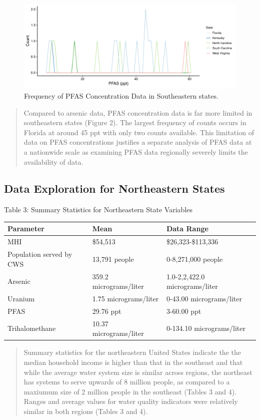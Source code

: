 \documentclass[12pt,]{article}
\begin{document}
\begin{figure}
\centering
\includegraphics{Project_Template_files/figure-latex/figs2-1.pdf}
\caption{Frequency of PFAS Concentration Data in Southeastern states.}
\end{figure}

\begin{quote}
Compared to arsenic data, PFAS concentration data is far more limited in
southeastern states (Figure 2). The largest frequency of counts occurs
in Florida at around 45 ppt with only two counts available. This
limitation of data on PFAS concentrations justifies a separate analysis
of PFAS data at a nationwide scale as examining PFAS data regionally
severely limits the availability of data.
\end{quote}

\newpage

\hypertarget{data-exploration-for-northeastern-states}{%
\subsection{Data Exploration for Northeastern
States}\label{data-exploration-for-northeastern-states}}

Table 3: Summary Statistics for Northeastern State Variables

\begin{longtable}[]{@{}lll@{}}
\toprule
\textbf{Parameter} & \textbf{Mean} & \textbf{Data Range}\tabularnewline
\midrule
\endhead
MHI & \$54,513 & \$26,323-\$113,336\tabularnewline
Population served by CWS & 13,791 people & 0-8,271,000
people\tabularnewline
Arsenic & 359.2 micrograms/liter & 1.0-2,2,422.0
micrograms/liter\tabularnewline
Uranium & 1.75 micrograms/liter & 0-43.00
micrograms/liter\tabularnewline
PFAS & 29.76 ppt & 3-60.00 ppt\tabularnewline
Trihalomethane & 10.37 micrograms/liter & 0-134.10
micrograms/liter\tabularnewline
\bottomrule
\end{longtable}

\begin{quote}
Summary statistics for the northeastern United States indicate the the
median household income is higher than that in the southeast and that
while the average water system size is similar across regions, the
northeast has systems to serve upwards of 8 million people, as compared
to a maxiumum size of 2 million people in the southeast (Tables 3 and
4). Ranges and average values for water quality indicators were
relatively similar in both regions (Tables 3 and 4).
\end{quote}
\end{document}
